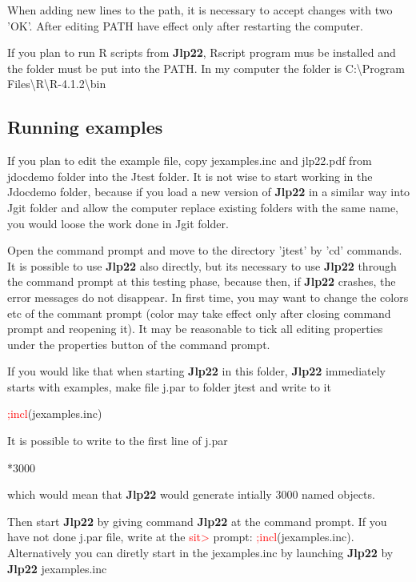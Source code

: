 When adding new lines to the path, it is necessary to accept changes with two 'OK'.
After editing PATH have effect only after restarting the computer.


If you plan to run R scripts from \textbf{Jlp22}, Rscript program mus be installed
and the folder must be put into the PATH. In my computer the folder is
C:\textbackslash Program Files\textbackslash R\textbackslash R-4.1.2\textbackslash bin


\subsection{Running examples}
\label{runex}

If you plan to edit the example file, copy jexamples.inc and jlp22.pdf  from jdocdemo folder into the Jtest folder.
It is not wise to start
working in the Jdocdemo folder, because if you load a new version of \textbf{Jlp22} in a similar way into Jgit folder
and allow the computer replace existing folders with the same name,
you would loose the work done in Jgit folder.

Open the command prompt and move to the directory 'jtest' by 'cd' commands.
It is possible to use \textbf{Jlp22} also directly, but its necessary to use \textbf{Jlp22} through the command prompt
at this testing phase, because then, if \textbf{Jlp22} crashes, the error messages do not disappear.
In first time, you may want to change
the colors etc of the commant prompt (color may take effect only after
closing command prompt and reopening it). It may be reasonable to tick all editing
properties under the properties button of the command prompt.

If you would like that when starting \textbf{Jlp22} in this folder, \textbf{Jlp22} immediately starts with examples,
make file j.par to folder jtest and write
to it

\textcolor{Red}{;incl}(jexamples.inc)

It is possible to write to the first line of j.par

*3000

which would mean that \textbf{Jlp22} would generate intially 3000 named objects.


Then start \textbf{Jlp22} by giving command \textbf{Jlp22} at the command prompt.
If you have not done j.par file, write at the \textcolor{Red}{sit>} prompt:  \textcolor{Red}{;incl}(jexamples.inc).
Alternatively you can diretly start in the jexamples.inc by launching \textbf{Jlp22} by\\
\textbf{Jlp22} jexamples.inc

